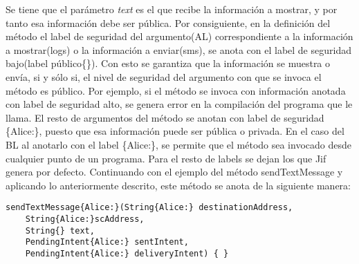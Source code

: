 Se tiene que el parámetro \emph{text} es el que recibe la información a mostrar,
y por tanto esa información debe ser pública.\newline 
Por consiguiente, en la definición del método el label de seguridad del
argumento(AL) correspondiente a la información a mostrar(logs) o la información
a enviar(sms), se anota con el label de seguridad bajo(label público\{\}). Con
esto se garantiza que la información se muestra o envía, si y sólo si, el nivel
de seguridad del argumento con que se invoca el método es público. Por ejemplo,
si el método se invoca con información anotada con label de seguridad alto, se
genera error en la compilación del programa que le llama.\newline 
El resto de argumentos del método se anotan con label de seguridad \{Alice:\},
puesto que esa información puede ser pública o privada.\newline
En el caso del BL al anotarlo con el label \{Alice:\}, se permite que el método
sea invocado desde cualquier punto de un programa. 
Para el resto de labels se dejan los que Jif genera por defecto.\newline
Continuando con el ejemplo del método sendTextMessage y aplicando lo
anteriormente descrito, este método se anota de la siguiente manera:
\begin{lstlisting}
sendTextMessage{Alice:}(String{Alice:} destinationAddress, 
	String{Alice:}scAddress, 
	String{} text, 
	PendingIntent{Alice:} sentIntent,
	PendingIntent{Alice:} deliveryIntent) { }
\end{lstlisting}

